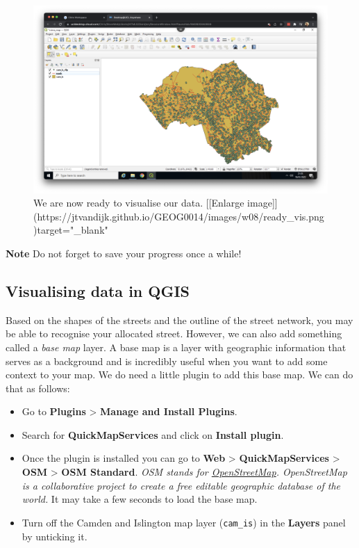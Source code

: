 \documentclass[
]{book}
\providecommand{\tightlist}{%
  \setlength{\itemsep}{0pt}\setlength{\parskip}{0pt}}
\begin{document}
\begin{figure}

{\centering \includegraphics[width=850pt]{images/w08/ready_vis} 

}

\caption{We are now ready to visualise our data. [[Enlarge image]](https://jtvandijk.github.io/GEOG0014/images/w08/ready_vis.png){target="_blank"}}\label{fig:ready-4-vis}
\end{figure}

\textbf{Note}
Do not forget to save your progress once a while!

\hypertarget{visualising-data-in-qgis}{%
\subsection*{Visualising data in QGIS}\label{visualising-data-in-qgis}}

Based on the shapes of the streets and the outline of the street network, you may be able to recognise your allocated street. However, we can also add something called a \emph{base map} layer. A base map is a layer with geographic information that serves as a background and is incredibly useful when you want to add some context to your map. We do need a little plugin to add this base map. We can do that as follows:

\begin{itemize}
\tightlist
\item
  Go to \textbf{Plugins} \textgreater{} \textbf{Manage and Install Plugins}.
\item
  Search for \textbf{QuickMapServices} and click on \textbf{Install plugin}.
\item
  Once the plugin is installed you can go to \textbf{Web} \textgreater{} \textbf{QuickMapServices} \textgreater{} \textbf{OSM} \textgreater{} \textbf{OSM Standard}. \emph{OSM stands for \href{https://www.openstreetmap.org/\#map=6/54.910/-3.432}{OpenStreetMap}. OpenStreetMap is a collaborative project to create a free editable geographic database of the world.} It may take a few seconds to load the base map.
\item
  Turn off the Camden and Islington map layer (\texttt{cam\_is}) in the \textbf{Layers} panel by unticking it.
\end{itemize}
\end{document}
